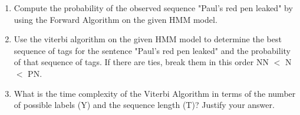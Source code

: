 \documentclass[12pt, letterpaper]{article}
\begin{document}
\begin{enumerate}
    \item Compute the probability of the observed sequence "Paul's red pen leaked" by using the Forward Algorithm on the given HMM model.

    \item Use the viterbi algorithm on the given HMM model to determine the best sequence of tags for the sentence "Paul's red pen leaked" and the probability of that sequence of tags. If there are ties, break them in this order  NN $<$ N $<$ PN. 

    \item What is the time complexity of the Viterbi Algorithm in terms of the number of possible labels (Y) and the sequence length (T)? Justify your answer. 

\end{enumerate}
\end{document}
